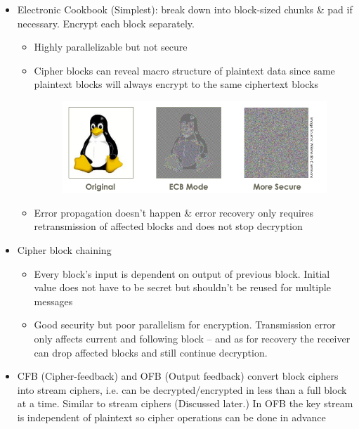 \documentclass[../notes.tex]{subfiles}
\begin{document}
\begin{itemize}
    \item Electronic Cookbook (Simplest): break down into block-sized chunks \& pad if necessary. Encrypt each block separately.
        \begin{itemize}
            \item Highly parallelizable  but not secure
            \item Cipher blocks can reveal macro structure of plaintext data since same plaintext blocks will always encrypt to the same ciphertext blocks
                \begin{figure}[H]
                    \centering
                    \includegraphics[width=0.8\linewidth]{img/image_2023-02-10-01-29-44.png}
                \end{figure}
            \item Error propagation doesn't happen \& error recovery only requires retransmission of affected blocks and does not stop decryption
        \end{itemize}
    \item Cipher block chaining
        \begin{itemize}
            \item Every block's input is dependent on output of previous block. Initial value does not have to be secret but shouldn't be reused for multiple messages
            \item Good security but poor parallelism for encryption. Transmission error only affects current and following block -- and as for recovery the receiver can drop affected blocks and still continue decryption.
        \end{itemize}
    \item CFB (Cipher-feedback) and OFB (Output feedback) convert block ciphers into stream ciphers, i.e. can be decrypted/encrypted in less than a full block at a time. Similar to stream ciphers (Discussed later.) In OFB the key stream is independent of plaintext so cipher operations can be done in advance
\end{itemize}
\end{document}
